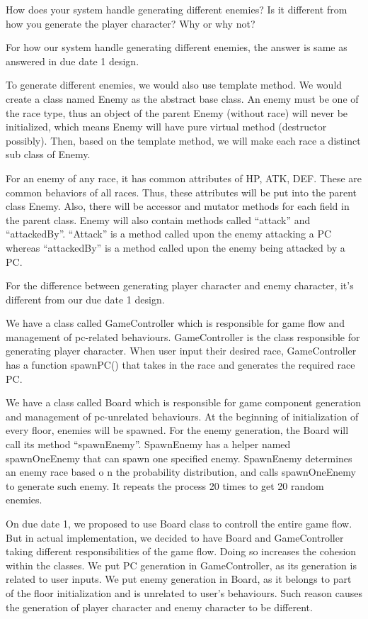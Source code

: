 \documentclass[11pt]{article}
\theoremstyle{plain} \newtheorem{theorem*}{Theorem}[subsection]
\begin{document}
How does your system handle generating different enemies? Is it different from
how you generate the player character? Why or why not? 

For how our system handle generating different enemies, the answer is same as
answered in due date 1 design. 

To generate different enemies, we would also use template method. We would
create a class named Enemy as the abstract base class. An enemy must be one of
the race type, thus an object of the parent Enemy (without race) will never be
initialized, which means Enemy will have pure virtual method (destructor
possibly). Then, based on the template method, we will make each race a
distinct sub class of Enemy.  

For an enemy of any race, it has common attributes of HP, ATK, DEF. These are
common behaviors of all races. Thus, these attributes will be put into the
parent class Enemy. Also, there will be accessor and mutator methods for each
field in the parent class. Enemy will also contain methods called “attack” and
“attackedBy”. “Attack” is a method called upon the enemy attacking a PC whereas
“attackedBy” is a method called upon the enemy being attacked by a PC. 

For the difference between generating player character and enemy character,
it’s different from our due date 1 design. 


We have a class called GameController which is responsible for game flow and
management of pc-related behaviours. GameController is the class responsible
for generating player character. When user input their desired race,
GameController has a function spawnPC() that takes in the race and generates
the required race PC.  

We have a class called Board which is responsible for game component generation
and management of pc-unrelated behaviours.  At the beginning of initialization
of every floor, enemies will be spawned. For the enemy generation, the Board
will call its method “spawnEnemy”. SpawnEnemy has a helper named spawnOneEnemy
that can spawn one specified enemy. SpawnEnemy determines an enemy race based o
n the probability distribution, and calls spawnOneEnemy to generate such enemy.
It repeats the process 20 times to get 20 random enemies. 

On due date 1, we proposed to use Board class to controll the entire game flow.
But in actual implementation, we decided to have Board and GameController
taking different responsibilities of the game flow. Doing so increases the
cohesion within the classes. We put PC generation in GameController, as its
generation is related to user inputs. We put enemy generation in Board, as it
belongs to part of the floor initialization and is unrelated to user’s
behaviours. Such reason causes the generation of player character and enemy
character to be different. 
\end{document}
